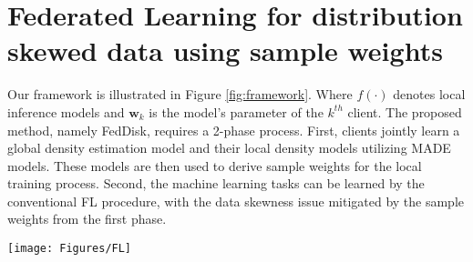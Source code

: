 \documentclass[journal]{IEEEtai}
\newcommand{\MethodnameLong}{Federated Learning for distribution skewed data using sample weights}
\newcommand{\MethodnameShort}{FedDisk}
\newcommand{\R}[1]{\label{#1}\linelabel{#1}}
\begin{document}
\section{\MethodnameLong{}}
\label{sec:methodology}
\R{par:howEffectiveness}

Our framework is illustrated in Figure \ref{fig:framework}. Where $f(\cdot)$ denotes local inference models and $\mathbf{w}_k$ is the model's parameter of the $k^{th}$ client. The proposed method, namely \MethodnameShort{}, requires a 2-phase process. First, clients jointly learn a global density estimation model and their local density models utilizing MADE models. These models are then used to derive sample weights for the local training process. Second, the machine learning tasks can be learned by the conventional FL procedure, with the data skewness issue mitigated by the sample weights from the first phase.
\begin{figure*}[ht!]
		\centering
		\texttt{[image: Figures/FL]}
		\caption{ \MethodnameShort{} Framework: The proposed framework has two phases. First, local and global probability density functions ($p(x),q(x)$) are estimated via MADE models leveraging FL procedures. Then, the sample weights $\alpha$ are computed by approximating density ratio via class probability estimation. Second, the machine learning tasks (e.g., classification) can be performed similar to a typical FL method (i.e., FedAvg) with the sample weights acquired from phase 1.} 
		\label{fig:framework} 

\end{figure*}  
\end{document}
